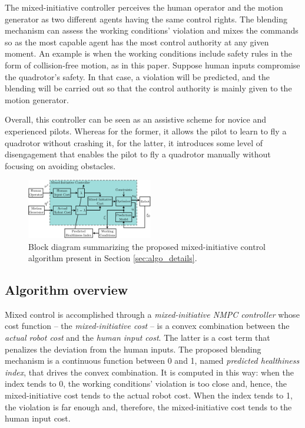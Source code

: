 The mixed-initiative controller perceives the human operator and the motion generator as two different agents having the same control rights. The blending mechanism can assess the working conditions' violation and mixes the commands so as the most capable agent has the most control authority at any given moment. An example is when the working conditions include safety rules in the form of collision-free motion, as in this paper. Suppose human inputs compromise the quadrotor's safety. In that case, a violation will be predicted, and the blending will be carried out so that the control authority is mainly given to the motion generator.

Overall, this controller can be seen as an assistive scheme for novice and experienced pilots. Whereas for the former, it allows the pilot to learn to fly a quadrotor without crashing it, for the latter, it introduces some level of disengagement that enables the pilot to fly a quadrotor manually without focusing on avoiding obstacles. 

\begin{figure}[t]
	\centering
	\includegraphics[width=0.49\textwidth]{figures/block_diagram}
	\vspace{-0.6cm}
	\caption{Block diagram summarizing the proposed mixed-initiative control algorithm present in Section \ref{sec:algo_details}.}\label{fig:block_diagram}%
\end{figure}

\subsection{Algorithm overview}
Mixed control is accomplished through a \emph{mixed-initiative NMPC controller} whose cost function -- the \emph{mixed-initiative cost}  -- is a convex combination between the \emph{actual robot cost} and the \emph{human input cost}. The latter is a cost term that penalizes the deviation from the human inputs. The  proposed blending mechanism is a continuous function between 0 and 1, named \emph{predicted healthiness index}, that drives the convex combination. It is computed in this way: when the index tends to 0, the working conditions' violation is too close and, hence, the mixed-initiative cost tends to the actual robot cost. When the index tends to 1, the violation is far enough and, therefore, the mixed-initiative cost tends to the human input cost.

